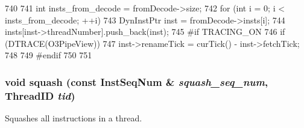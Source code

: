 \begin{DoxyCode}
740 {
741     int insts_from_decode = fromDecode->size;
742     for (int i = 0; i < insts_from_decode; ++i) {
743         DynInstPtr inst = fromDecode->insts[i];
744         insts[inst->threadNumber].push_back(inst);
745 #if TRACING_ON
746         if (DTRACE(O3PipeView)) {
747             inst->renameTick = curTick() - inst->fetchTick;
748         }
749 #endif
750     }
751 }
\end{DoxyCode}
\hypertarget{classDefaultRename_aa896d7ff2c9da1e6e96d46ab4580ec9d}{
\subsubsection[{squash}]{\setlength{\rightskip}{0pt plus 5cm}void squash (const {\bf InstSeqNum} \& {\em squash\_\-seq\_\-num}, \/  {\bf ThreadID} {\em tid})}}
\label{classDefaultRename_aa896d7ff2c9da1e6e96d46ab4580ec9d}
Squashes all instructions in a thread. 


